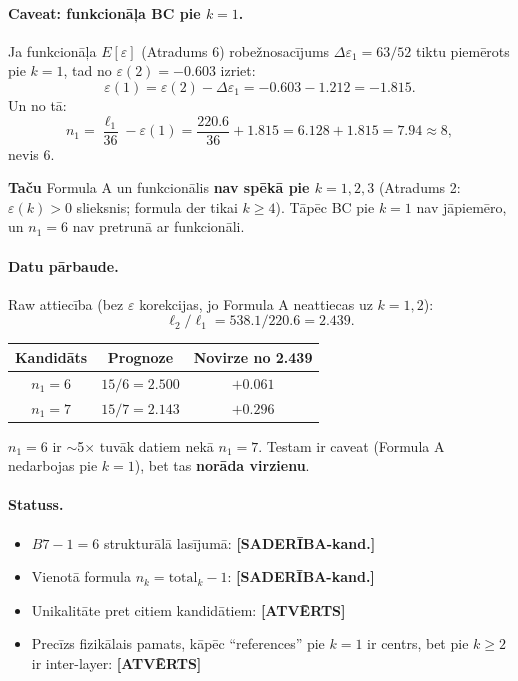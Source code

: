 \documentclass[12pt,a4paper]{article}
\begin{document}
\paragraph{Caveat: funkcionāļa BC pie $k=1$.}
Ja funkcionāļa $E[\varepsilon]$ (Atradums 6) robežnosacījums $\Delta\varepsilon_1 = 63/52$ tiktu piemērots pie $k=1$, tad no $\varepsilon(2) = -0.603$ izriet:
\[
\varepsilon(1) = \varepsilon(2) - \Delta\varepsilon_1 = -0.603 - 1.212 = -1.815.
\]
Un no tā:
\[
n_1 = \frac{\ell_1}{36} - \varepsilon(1) = \frac{220.6}{36} + 1.815 = 6.128 + 1.815 = 7.94 \approx 8,
\]
nevis $6$.

\textbf{Taču} Formula A un funkcionālis \textbf{nav spēkā pie $k=1,2,3$} (Atradums 2: $\varepsilon(k) > 0$ slieksnis; formula der tikai $k \geq 4$). Tāpēc BC pie $k=1$ nav jāpiemēro, un $n_1 = 6$ nav pretrunā ar funkcionāli.

\paragraph{Datu pārbaude.}
Raw attiecība (bez $\varepsilon$ korekcijas, jo Formula A neattiecas uz $k=1,2$):
\[
\ell_2/\ell_1 = 538.1/220.6 = 2.439.
\]
\begin{table}[h]
\centering
\begin{tabular}{|c|c|c|}
\hline
\textbf{Kandidāts} & \textbf{Prognoze} & \textbf{Novirze no 2.439} \\
\hline
$n_1 = 6$ & $15/6 = 2.500$ & $+0.061$ \\
$n_1 = 7$ & $15/7 = 2.143$ & $+0.296$ \\
\hline
\end{tabular}
\end{table}

$n_1 = 6$ ir $\sim$5$\times$ tuvāk datiem nekā $n_1 = 7$. Testam ir caveat (Formula A nedarbojas pie $k=1$), bet tas \textbf{norāda virzienu}.

\paragraph{Statuss.}
\begin{itemize}
    \item $B7 - 1 = 6$ strukturālā lasījumā: \textbf{[SADERĪBA-kand.]}
    \item Vienotā formula $n_k = \text{total}_k - 1$: \textbf{[SADERĪBA-kand.]}
    \item Unikalitāte pret citiem kandidātiem: \textbf{[ATVĒRTS]}
    \item Precīzs fizikālais pamats, kāpēc ``references'' pie $k=1$ ir centrs, bet pie $k\geq 2$ ir inter-layer: \textbf{[ATVĒRTS]}
\end{itemize}
\end{document}
